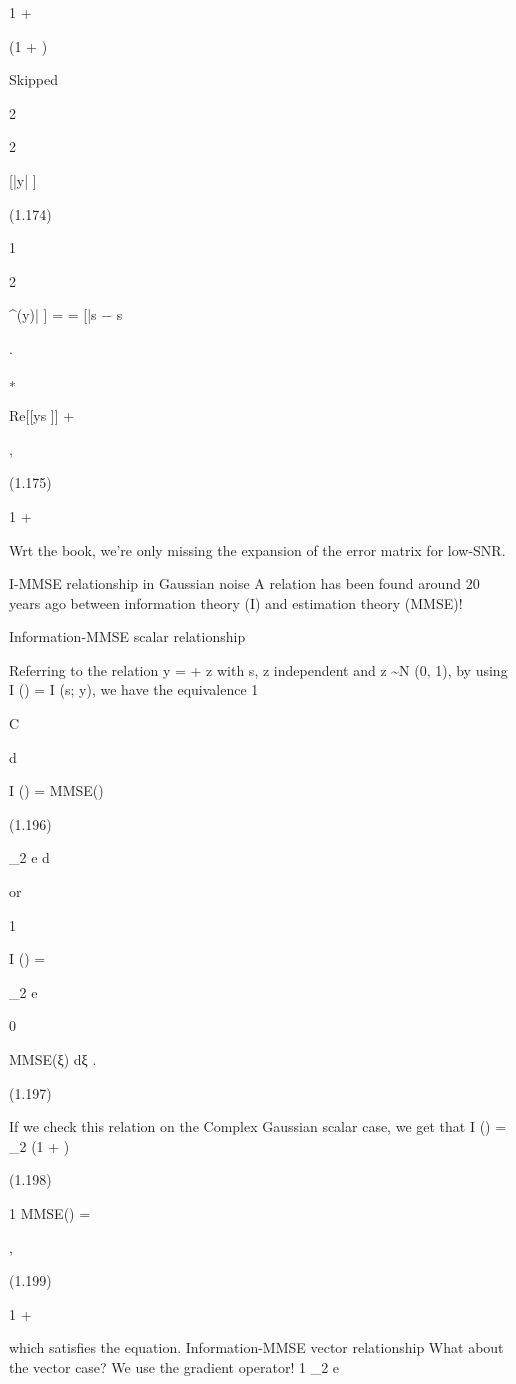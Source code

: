 {1 + \rho

(1 + \rho)

Skipped

2

2

[|y| ]

(1.174)

1

2

^(y)| ] =
= [|s − s

.

\rho

∗

Re[[ys ]] +

,

(1.175)

1 + \rho

Wrt the book, we're only missing the expansion of the error matrix for low-SNR.

I-MMSE relationship in Gaussian noise A relation has been found around 20 years ago between information theory (I) and estimation theory (MMSE)!

Information-MMSE scalar relationship

Referring to the relation y = \sqrt{\rhos} + z with s, z independent and z \sim N (0, 1), by using I (\rho) = I (s; y), we have the equivalence 1

C

d

I (\rho) = MMSE(\rho)

(1.196)

\log_2 e d\rho

or

1

I (\rho) = \int

\log_2 e

0

\rho

MMSE(ξ) dξ .

(1.197)

If we check this relation on the Complex Gaussian scalar case, we get that I (\rho) = \log_2 (1 + \rho)

(1.198)

1 MMSE(\rho) =

,

(1.199)

1 + \rho

which satisfies the equation.
Information-MMSE vector relationship What about the vector case? We use the gradient operator!
1
\log_2 e

}
